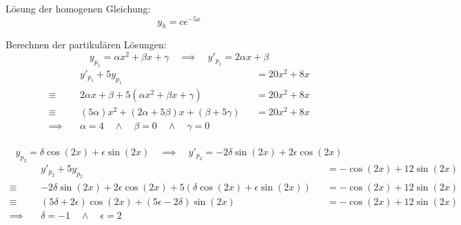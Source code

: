 \documentclass[answers]{exam}
\begin{document}
\begin{questions}
\begin{solution}
        Lösung der homogenen Gleichung:
        $$
            y_h = ce^{-5x}
        $$

        Berechnen der partikulären Lösungen:
        $$
            \boxed{
            y_{p_1} = \alpha x^2 + \beta x + \gamma \quad \implies \quad y'_{p_1} = 2\alpha x + \beta
            }
        $$
        $$
            \begin{aligned}
                               & y'_{p_1} + 5y_{p_1}                                                 &  & = 20x^2 + 8x \\
                \equiv \quad   & 2\alpha x + \beta + 5 \left( \alpha x^2 + \beta x + \gamma \right)  &  & = 20x^2 + 8x \\
                \equiv \quad   & (5\alpha) x^2 + (2\alpha + 5\beta) x + (\beta + 5\gamma)            &  & = 20x^2 + 8x \\
                \implies \quad & \alpha = 4 \quad \land \quad \beta = 0 \quad \land \quad \gamma = 0                   \\
            \end{aligned}
        $$

        $$
            \boxed{
            y_{p_2} = \delta \cos(2x) + \epsilon \sin(2x) \quad \implies \quad y'_{p_2} = -2\delta \sin(2x) + 2\epsilon \cos(2x)
            }
        $$
        $$
            \begin{aligned}
                               & y'_{p_2} + 5y_{p_2}                                                                         &  & = - \cos(2x) + 12\sin(2x) \\
                \equiv \quad   & -2\delta \sin(2x) + 2\epsilon \cos(2x) + 5 \left(\delta \cos(2x) + \epsilon \sin(2x)\right) &  & = - \cos(2x) + 12\sin(2x) \\
                \equiv \quad   & (5 \delta + 2\epsilon) \cos(2x) + (5\epsilon - 2\delta) \sin(2x)                            &  & = - \cos(2x) + 12\sin(2x) \\
                \implies \quad & \delta = -1 \quad \land \quad \epsilon = 2                                                                                 \\
            \end{aligned}
        $$


\end{solution}
\end{questions}
\end{document}
